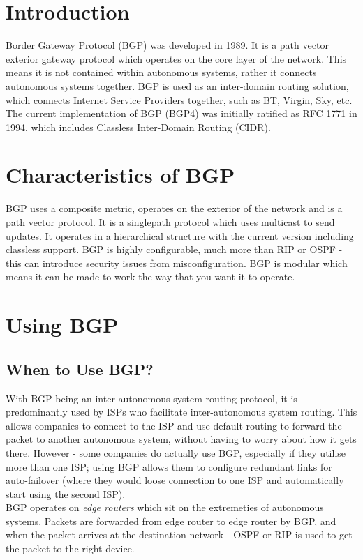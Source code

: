 
\section{Introduction}
Border Gateway Protocol (BGP) was developed in 1989. It is a path vector exterior gateway protocol which operates on the core layer of the network. This means it is not contained within autonomous systems, rather it connects autonomous systems together. BGP is used as an inter-domain routing solution, which connects Internet Service Providers together, such as BT, Virgin, Sky, etc. The current implementation of BGP (BGP4) was initially ratified as RFC 1771 in 1994, which includes Classless Inter-Domain Routing (CIDR). 

\section{Characteristics of BGP}
BGP uses a composite metric, operates on the exterior of the network and is a path vector protocol. It is a singlepath protocol which uses multicast to send updates. It operates in a hierarchical structure with the current version including classless support. BGP is highly configurable, much more than RIP or OSPF - this can introduce security issues from misconfiguration. BGP is modular which means it can be made to work the way that you want it to operate. 

\section{Using BGP}
\subsection{When to Use BGP?}
With BGP being an inter-autonomous system routing protocol, it is predominantly used by ISPs who facilitate inter-autonomous system routing. This allows companies to connect to the ISP and use default routing to forward the packet to another autonomous system, without having to worry about how it gets there. However - some companies do actually use BGP, especially if they utilise more than one ISP; using BGP allows them to configure redundant links for auto-failover (where they would loose connection to one ISP and automatically start using the second ISP).\\

BGP operates on \textit{edge routers} which sit on the extremeties of autonomous systems. Packets are forwarded from edge router to edge router by BGP, and when the packet arrives at the destination network - OSPF or RIP is used to get the packet to the right device. 
